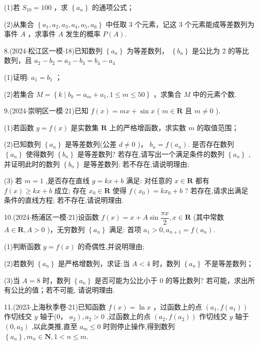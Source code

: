 (1)若 ${S}_{10} = {100}$ ，求 $\left\{  {a}_{n}\right\}$ 的通项公式；

(2)从集合 $\left\{  {{a}_{1},{a}_{2},{a}_{3},{a}_{4},{a}_{5},{a}_{6}}\right\}$ 中任取 3 个元素，记这 3 个元素能成等差数列为事件 $A$ ，求事件 $A$ 发生的概率 $P\left( A\right)$.

8.(2024$\cdot$松江区一模$\cdot$18)已知数列 $\left\{  {a}_{n}\right\}$ 为等差数列， $\left\{  {b}_{n}\right\}$ 是公比为 2 的等比数列，且 ${a}_{2} - {b}_{2} = {a}_{3} -  {b}_{3} = {b}_{4} - {a}_{4}$

(1)证明: ${a}_{1} = {b}_{1}$ ；

(2)若集合 $M = \left\{  {k \mid  {b}_{k} = {a}_{m} + {a}_{1},1 \leq  m \leq  {50}}\right\}$ ，求集合 $M$ 中的元素个数.

9.(2024$\cdot$崇明区一模$\cdot$21)已知 $f\left( x\right)  = {mx} + \sin x$ ( $m \in  \mathbf{R}$ 且 $m \neq  0$ ).

(1)若函数 $y = f\left( x\right)$ 是实数集 $\mathbf{R}$ 上的严格增函数，求实数 $m$ 的取值范围；

(2)已知数列 $\left\{  {a}_{n}\right\}$ 是等差数列(公差 $d \neq  0$ )， ${b}_{n} = f\left( {a}_{n}\right)$. 是否存在数列 $\left\{  {a}_{n}\right\}$ 使得数列 $\left\{  {b}_{n}\right\}$ 是等差数列? 若存在,请写出一个满足条件的数列 $\left\{  {a}_{n}\right\}$ ,并证明此时的数列 $\left\{  {b}_{n}\right\}$ 是等差数列; 若不存在,请说明理由;

(3) 若 $m = 1$ ,是否存在直线 $y = {kx} + b$ 满足:    对任意的 $x \in  \mathbf{R}$ 都有 $f\left( x\right)  \geq  {kx} + b$ 成立;    存在 ${x}_{0} \in  \mathbf{R}$ 使得 $f\left( {x}_{0}\right)  = k{x}_{0} + b$ ? 若存在,请求出满足条件的直线方程; 若不存在,请说明理由.

10.(2024$\cdot$杨浦区一模$\cdot$21)设函数 $f\left( x\right)  = x + A\sin \dfrac{\pi x}{2},x \in  \mathbf{R}$ (其中常数 $A \in  \mathbf{R},A > 0$ )，无穷数列 $\left\{  {a}_{n}\right\}$ 满足: 首项 ${a}_{1} > 0,{a}_{n + 1} = f\left( {a}_{n}\right)$.

(1)判断函数 $y = f\left( x\right)$ 的奇偶性,并说明理由;

(2)若数列 $\left\{  {a}_{n}\right\}$ 是严格增数列，求证:当 $A < 4$ 时，数列 $\left\{  {a}_{n}\right\}$ 不是等差数列；

(3)当 $A = 8$ 时，数列 $\left\{  {a}_{n}\right\}$ 是否可能为公比小于 0 的等比数列? 若可能，求出所有公比的值；若不可能, 请说明理由.

11.(2023$\cdot$上海秋季卷$\cdot$21)已知函数 $f\left( x\right)  = \ln x$ ，过函数上的点 $\left( {{a}_{1},f\left( {a}_{1}\right) }\right)$ 作切线交 $y$ 轴于(0， $\left. {a}_{2}\right) ,{a}_{2} > 0$ ,过函数上的点 $\left( {{a}_{2},f\left( {a}_{2}\right) }\right)$ 作切线交 $y$ 轴于 $\left( {0,{a}_{3}}\right)$ ,以此类推,直至 ${a}_{m} \leq  0$ 时则停止操作,得到数列 $\left\{  {a}_{n}\right\}  ,{m}_{n} \in  \mathbf{N},1 < n \leq  m$.

